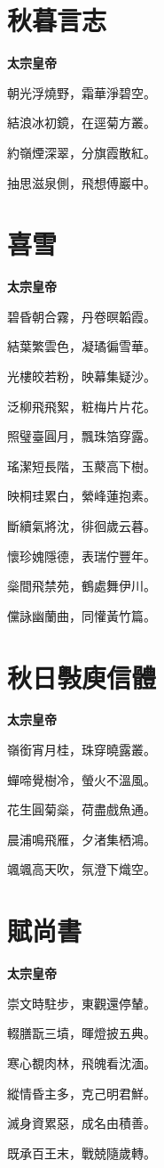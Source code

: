 \documentclass[12pt,a4paper]{ctexbook}
\begin{document}
\section{秋暮言志}
\textbf{太宗皇帝}\par\vspace{0.5em}
朝光浮燒野，霜華淨碧空。\par
結浪冰初鏡，在逕菊方叢。\par
約嶺煙深翠，分旗霞散紅。\par
抽思滋泉側，飛想傅巖中。\par

\section{喜雪}
\textbf{太宗皇帝}\par\vspace{0.5em}
碧昏朝合霧，丹卷暝韜霞。\par
結葉繁雲色，凝璚徧雪華。\par
光樓皎若粉，映幕集疑沙。\par
泛柳飛飛絮，粧梅片片花。\par
照璧臺圓月，飄珠箔穿露。\par
瑤潔短長階，玉藂高下樹。\par
映桐珪累白，縈峰蓮抱素。\par
斷續氣將沈，徘徊歲云暮。\par
懷珍媿隱德，表瑞佇豐年。\par
橤間飛禁苑，鶴處舞伊川。\par
儻詠幽蘭曲，同懽黃竹篇。\par

\section{秋日斅庾信體}
\textbf{太宗皇帝}\par\vspace{0.5em}
嶺銜宵月桂，珠穿曉露叢。\par
蟬啼覺樹冷，螢火不溫風。\par
花生圓菊橤，荷盡戲魚通。\par
晨浦鳴飛雁，夕渚集栖鴻。\par
颯颯高天吹，氛澄下熾空。\par

\section{賦尚書}
\textbf{太宗皇帝}\par\vspace{0.5em}
崇文時駐步，東觀還停輦。\par
輟膳翫三墳，暉燈披五典。\par
寒心覩肉林，飛魄看沈湎。\par
縱情昏主多，克己明君鮮。\par
滅身資累惡，成名由積善。\par
既承百王末，戰兢隨歲轉。\par
\end{document}
